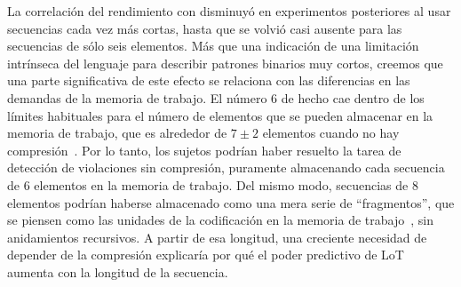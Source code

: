 La correlación del rendimiento con \mdlbin disminuyó en experimentos posteriores al usar secuencias cada vez más cortas, hasta que se volvió casi ausente para las secuencias de sólo seis elementos. Más que una indicación de una limitación intrínseca del lenguaje para describir patrones binarios muy cortos, creemos que una parte significativa de este efecto se relaciona con las diferencias en las demandas de la memoria de trabajo. El número 6 de hecho cae dentro de los límites habituales para el número de elementos que se pueden almacenar en la memoria de trabajo, que es alrededor de $7 \pm 2$ elementos cuando no hay compresión~\cite{f16,f29}. Por lo tanto, los sujetos podrían haber resuelto la tarea de detección de violaciones sin compresión, puramente almacenando cada secuencia de 6 elementos en la memoria de trabajo. Del mismo modo, secuencias de 8 elementos podrían haberse almacenado como una mera serie de ``fragmentos'', que se piensen como las unidades de la codificación en la memoria de trabajo~\cite{f16,f86,f108,f109}, sin anidamientos recursivos. A partir de esa longitud, una creciente necesidad de depender de la compresión explicaría por qué el poder predictivo de LoT aumenta con la longitud de la secuencia.


